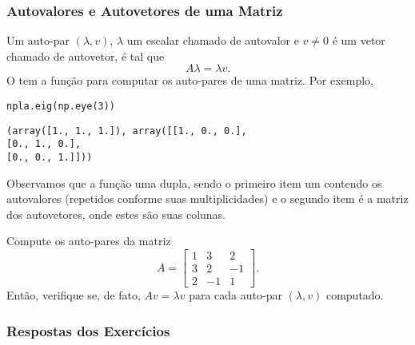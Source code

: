 \subsubsection{Autovalores e Autovetores de uma Matriz}

Um auto-par $(\lambda, v)$, $\lambda$ um escalar chamado de autovalor e $v\neq 0$ é um vetor chamado de autovetor, é tal que
\begin{equation}
  A\lambda = \lambda v.
\end{equation}
O {\PYTHONnumpy} tem a função {\PYTHONnumpyDOTlinalgDOTeig} para computar os auto-pares de uma matriz. Por exemplo,

\begin{lstlisting}
npla.eig(np.eye(3))
\end{lstlisting}

\begin{verbatim}
(array([1., 1., 1.]), array([[1., 0., 0.],
[0., 1., 0.],
[0., 0., 1.]]))
\end{verbatim}

Observamos que a função uma dupla, sendo o primeiro item um {\PYTHONnumpyDOTarray} contendo os autovalores (repetidos conforme suas multiplicidades) e o segundo item é a matriz dos autovetores, onde estes são suas colunas.

\begin{exr}
  Compute os auto-pares da matriz
  \begin{equation}
    A =
    \begin{bmatrix}
      1 & 3 & 2\\
      3 & 2 & -1\\
      2 & -1 & 1
    \end{bmatrix}.
  \end{equation}
  Então, verifique se, de fato, $Av = \lambda v$ para cada auto-par $(\lambda, v)$ computado.
\end{exr}

\ifisbook 
\subsubsection*{Respostas dos Exercícios}
\shipoutAnswer
\fi
